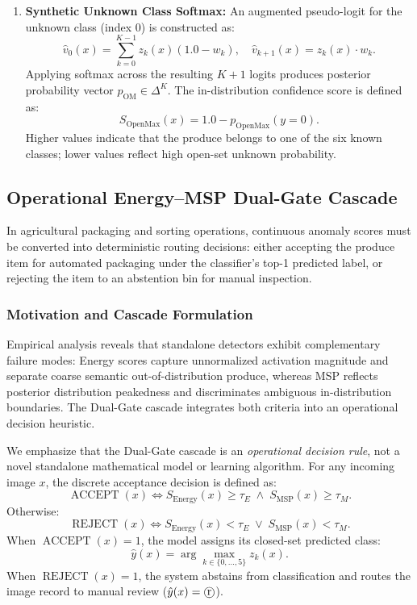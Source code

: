 \begin{enumerate}
\item \textbf{Synthetic Unknown Class Softmax:} An augmented pseudo-logit for the unknown class (index 0) is constructed as:
\begin{equation}
\hat{v}_0(x) = \sum_{k=0}^{K-1} z_k(x) (1.0 - w_k), \quad \hat{v}_{k+1}(x) = z_k(x) \cdot w_k.
\end{equation}
Applying softmax across the resulting $K+1$ logits produces posterior probability vector $p_{\text{OM}} \in \Delta^K$. The in-distribution confidence score is defined as:
\begin{equation}
S_{\text{OpenMax}}(x) = 1.0 - p_{\text{OpenMax}}(y = 0).
\end{equation}
Higher values indicate that the produce belongs to one of the six known classes; lower values reflect high open-set unknown probability.
\end{enumerate}

\subsection{Operational Energy--MSP Dual-Gate Cascade}
\label{sec:dualgate_cascade}

In agricultural packaging and sorting operations, continuous anomaly scores must be converted into deterministic routing decisions: either accepting the produce item for automated packaging under the classifier's top-1 predicted label, or rejecting the item to an abstention bin for manual inspection.

\subsubsection{Motivation and Cascade Formulation}
Empirical analysis reveals that standalone detectors exhibit complementary failure modes: Energy scores capture unnormalized activation magnitude and separate coarse semantic out-of-distribution produce, whereas MSP reflects posterior distribution peakedness and discriminates ambiguous in-distribution boundaries. The Dual-Gate cascade integrates both criteria into an operational decision heuristic.

We emphasize that the Dual-Gate cascade is an \textit{operational decision rule}, not a novel standalone mathematical model or learning algorithm. For any incoming image $x$, the discrete acceptance decision is defined as:
\begin{equation}
\label{eq:dualgate_rule}
\operatorname{ACCEPT}(x) \iff S_{\text{Energy}}(x) \ge \tau_E \;\land\; S_{\text{MSP}}(x) \ge \tau_M.
\end{equation}
Otherwise:
\begin{equation}
\operatorname{REJECT}(x) \iff S_{\text{Energy}}(x) < \tau_E \;\lor\; S_{\text{MSP}}(x) < \tau_M.
\end{equation}
When $\operatorname{ACCEPT}(x) = 1$, the model assigns its closed-set predicted class:
\begin{equation}
\hat{y}(x) = \arg\max_{k \in \{0, \dots, 5\}} z_k(x).
\end{equation}
When $\operatorname{REJECT}(x) = 1$, the system abstains from classification and routes the image record to manual review ($\hat{y}(x) = \text{\textcircled{r}}$).

